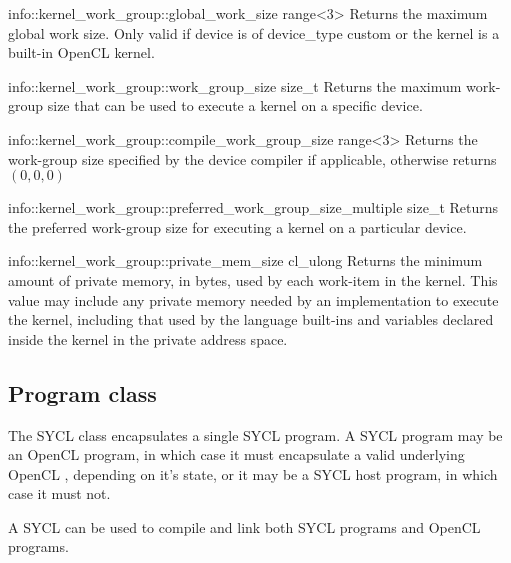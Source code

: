 \addInfoRow
{info::kernel_work_group::global_work_size}
{range<3>}
{Returns the maximum global work size. Only valid if device is of device_type 
 custom or the kernel is a built-in OpenCL kernel.}

\addInfoRow
{info::kernel_work_group::work_group_size}
{size_t}
{Returns the maximum work-group size that can be used to execute 
  a kernel on a specific device. }

\addInfoRow
{info::kernel_work_group::compile_work_group_size}
{range<3>}
{Returns the work-group size specified by the device compiler if applicable, 
  otherwise returns $(0,0,0)$}

\addInfoRow
{info::kernel_work_group::preferred_work_group_size_multiple}
{size_t}
{
  Returns the preferred work-group size for executing a kernel on a particular
  device.
}

\addInfoRow
{info::kernel_work_group::private_mem_size}
{cl_ulong}
{
  Returns the minimum amount of private memory, in bytes, used by each work-item
  in the kernel. This value may include any private memory needed by an 
  implementation to execute the kernel, including that used by the language
  built-ins and variables declared inside the kernel in the private address
  space.
}

\completeInfoTable


\subsection{Program class}
\label{sec:interfaces.program.class}

The SYCL  class encapsulates a single SYCL program. A SYCL program may be an OpenCL program, in which case it must encapsulate a valid underlying OpenCL , depending on it's state, or it may be a SYCL host program, in which case it must not.

A SYCL  can be used to compile and link both SYCL programs and OpenCL programs.

